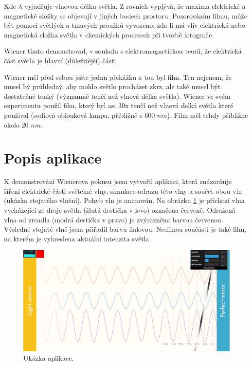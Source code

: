 \documentclass[12pt,a4paper,titlepage,final]{report}
\begin{document}
Kde $\lambda$ vyjadřuje vlnovou délku světla. Z rovnich vyplývá, že
maxima elektrické a magnetické složky se objevují v jiných bodech prostoru. Pozorováním filmu, může být pomocí světlých a tmavých proužků vyvozeno, zda-li má vliv elektrická nebo magnetická složka světla v chemických procesech při tvorbě fotografie.

Wiener tímto demonstroval, v souladu s elektromagnetickou teorii, že elektrická část světla je hlavní (důležitější) části.

Wiener měl před sebou ješte jednu překážku a tou byl film. Ten nejenom, že musel bý průhledný, aby mohlo světlo procházet zkrz, ale také musel být dostatečné tenký (významně tenčí než vlnová délka světla).
Wiener ve svém experimentu použil film, který byl asi 30x tenčí než 
vlnová delká světla které použival (sodiová oblouková lampa, přibližně s 600 $nm$). Film měl tehdy přibližne okolo 20 $nm$.

\section{Popis aplikace}
K demonstrování Wienerova pokusu jsem vytvořil aplikaci, která znázorňuje šíření elektrické části světelné vlny, simulace odrazu této vlny a 
součet obou vln (ukázka stojatého vlnění). Pohyb vln je animován. Na obrázku \ref{fig:aplikace} je příchozí vlna vycházející
ze droje světla (žlutá destička v levo) označena červeně. Odražená vlna od zrcadla (modrá destička v pravo) je zvýrazněna barvou červenou.
Výsledné stojaté vlně jsem přiřadil barvu fialovou. Nedílnou součásti je také film, na kterém je vykreslena aktuální intenzita světla.

\begin{figure}[!htb]
   \centering
 	\includegraphics[width=\textwidth]{aplikace}
   \caption{Ukázka aplikace.}
   \label{fig:aplikace}
\end{figure}
\end{document}
